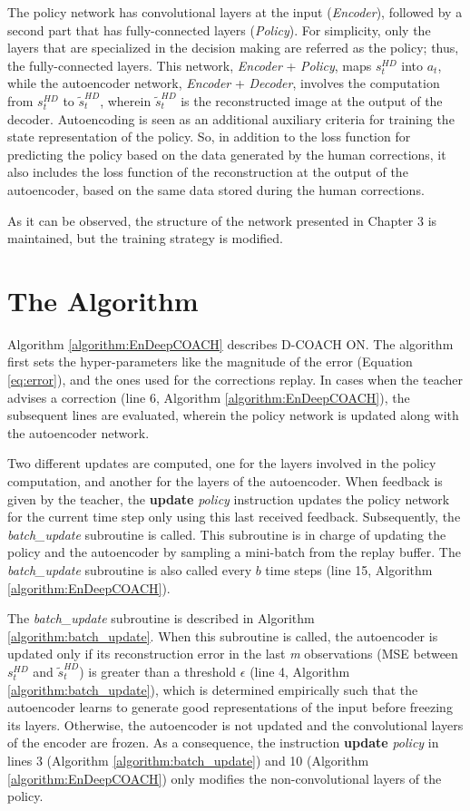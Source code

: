 The policy network has convolutional layers at the input (\emph{Encoder}), followed by a second part that has fully-connected layers (\emph{Policy}). For simplicity, only the layers that are specialized in the decision making are referred as the policy; thus, the fully-connected layers. This network, \emph{Encoder} + \emph{Policy}, maps $s_{t}^{HD}$ into $a_{t}$, while the autoencoder network, \emph{Encoder} + \emph{Decoder}, involves the computation from $s_{t}^{HD}$ to $\widetilde s_{t}^{HD}$, wherein $\widetilde s_{t}^{HD}$ is the reconstructed image at the output of the decoder. Autoencoding is seen as an additional auxiliary criteria for training the state representation of the policy. So, in addition to the loss function for predicting the policy based on the data generated by the human corrections, it also includes the loss function of the reconstruction at the output of the autoencoder, based on the same data stored during the human corrections.

As it can be observed, the structure of the network presented in Chapter 3 is maintained, but the training strategy is modified. 

\section{The Algorithm}
Algorithm \ref{algorithm:EnDeepCOACH} describes D-COACH ON. The algorithm first sets the hyper-parameters like the magnitude of the error (Equation \ref{eq:error}), and the ones used for the corrections replay. In cases when the teacher advises a correction (line 6, Algorithm \ref{algorithm:EnDeepCOACH}), the subsequent lines are evaluated, wherein the policy network is updated along with the autoencoder network.

Two different updates are computed, one for the layers involved in the policy computation, and another for the layers of the autoencoder. When feedback is given by the teacher, the \textbf{update} \emph{policy} instruction updates the policy network for the current time step only using this last received feedback. Subsequently, the \emph{batch\_update} subroutine is called. This subroutine is in charge of updating the policy and the autoencoder by sampling a mini-batch from the replay buffer. The \emph{batch\_update} subroutine is also called every $b$ time steps (line 15, Algorithm \ref{algorithm:EnDeepCOACH}).

The \emph{batch\_update} subroutine is described in Algorithm \ref{algorithm:batch_update}. When this subroutine is called, the autoencoder is updated only if its reconstruction error in the last \emph{m} observations (MSE between  $s_{t}^{HD}$ and $\widetilde s_{t}^{HD}$) is greater than a threshold $\epsilon$ (line 4, Algorithm \ref{algorithm:batch_update}), which is determined empirically such that the autoencoder learns to generate good representations of the input before freezing its layers. Otherwise, the autoencoder is not updated and the convolutional layers of the encoder are frozen. As a consequence, the instruction \textbf{update} \emph{policy} in lines 3 (Algorithm \ref{algorithm:batch_update}) and 10 (Algorithm \ref{algorithm:EnDeepCOACH}) only modifies the non-convolutional layers of the policy. 

